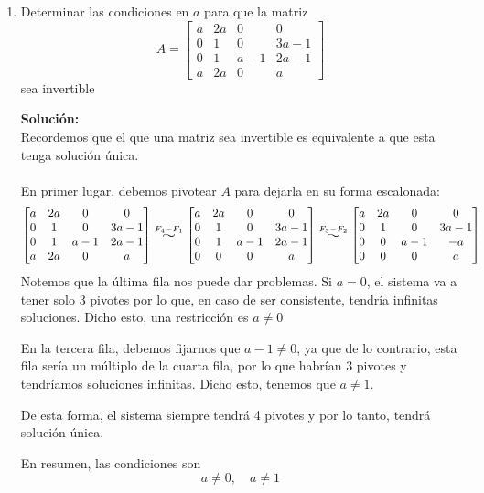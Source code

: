 \documentclass[12pt]{article}
\newenvironment{solucion}
{\begin{mdframed}[backgroundcolor=black!10]
		{\bf Solución:}\\
	}
	{
	\end{mdframed}
}
\newenvironment{preguntas}
{\begin{enumerate}\itemsep12pt
	}
	{
	\end{enumerate}
}
\newcommand{\widesim}[2][1.5]{
	\mathrel{\overset{#2}{\scalebox{#1}[1]{$\sim$}}}
}
\begin{document}
\begin{preguntas}
\item Determinar las condiciones en $a$ para que la matriz
	$$A = \begin{bmatrix}
	a & 2a & 0 & 0 \\
	0 & 1 & 0 & 3a-1\\
	0 & 1 & a-1 & 2a-1\\
	a & 2a & 0 & a
	\end{bmatrix}$$
	sea invertible
\begin{solucion}
Recordemos que el que una matriz sea invertible es equivalente a que esta tenga solución única.\\\\En primer lugar, debemos pivotear $A$ para dejarla en su forma escalonada:
		$$\begin{bmatrix}
		a & 2a & 0 & 0 \\
		0 & 1 & 0 & 3a-1\\
		0 & 1 & a-1 & 2a-1\\
		a & 2a & 0 & a
		\end{bmatrix} \widesim{F_4-F_1}
		\begin{bmatrix}
		a & 2a & 0 & 0 \\
		0 & 1 & 0 & 3a-1\\
		0 & 1 & a-1 & 2a-1\\
		0 & 0 & 0 & a
		\end{bmatrix} \widesim{F_3-F_2}
		\begin{bmatrix}
		a & 2a & 0 & 0 \\
		0 & 1 & 0 & 3a-1\\
		0 & 0 & a-1 & -a\\
		0 & 0 & 0 & a
		\end{bmatrix}$$
		Notemos que la última fila nos puede dar problemas. Si $a=0$, el sistema va a tener solo 3 pivotes por lo que, en caso de ser consistente, tendría infinitas soluciones. Dicho esto, una restricción es $a\neq 0$
		
		En la tercera fila, debemos fijarnos que $a-1 \neq 0$, ya que de lo contrario, esta fila sería un múltiplo de la cuarta fila, por lo que habrían 3 pivotes y tendríamos soluciones infinitas. Dicho esto, tenemos que $a \neq 1$.
		
		De esta forma, el sistema siempre tendrá 4 pivotes y por lo tanto, tendrá solución única.
		
		En resumen, las condiciones son
		$$a \neq 0, \quad a \neq 1$$
\end{solucion}
\end{preguntas}
\end{document}
